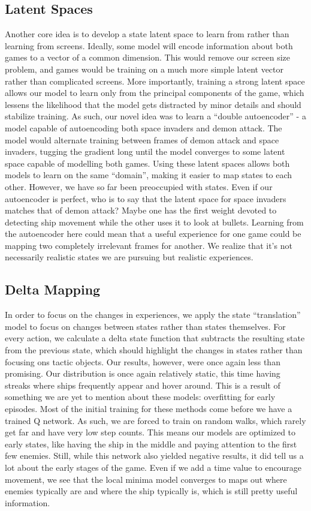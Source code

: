 \documentclass{article} %
\begin{document}
\subsection{Latent Spaces}
Another core idea is to develop a state latent space to learn from rather than learning from
screens. Ideally, some model will encode information about both games to a vector of a common
dimension. This would remove our screen size problem, and games would be training on a much more
simple latent vector rather than complicated screens. More importantly, training a strong latent
space allows our model to learn only from the principal components of the game, which lessens the
likelihood that the model gets distracted by minor details and should stabilize training. As such,
our novel idea was to learn a ``double autoencoder'' - a model capable of autoencoding both space
invaders and demon attack. The model would alternate training between frames of demon attack and
space invaders, tugging the gradient long until the model converges to some latent space capable of
modelling both games. Using these latent spaces allows both models to learn on the same “domain”,
making it easier to map states to each other. However, we have so far been preoccupied with states.
Even if our autoencoder is perfect, who is to say that the latent space for space invaders matches
that of demon attack? Maybe one has the first weight devoted to detecting ship movement while the
other uses it to look at bullets. Learning from the autoencoder here could mean that a useful
experience for one game could be mapping two completely irrelevant frames for another. We realize
that it's not necessarily realistic states we are pursuing but realistic experiences.

\subsection{Delta Mapping}
In order to focus on the changes in experiences, we apply the state ``translation'' model to focus on
changes between states rather than states themselves. For every action, we calculate a delta state
function that subtracts the resulting state from the previous state, which should highlight the
changes in states rather than focusing ons tactic objects. Our results, however, were once again
less than promising. Our distribution is once again relatively static, this time having streaks
where ships frequently appear and hover around. This is a result of something we are yet to mention
about these models: overfitting for early episodes. Most of the initial training for these methods
come before we have a trained Q network. As such, we are forced to train on random walks, which
rarely get far and have very low step counts. This means our models are optimized to early states,
like having the ship in the middle and paying attention to the first few enemies. Still, while this
network also yielded negative results, it did tell us a lot about the early stages of the game. Even
if we add a time value to encourage movement, we see that the local minima model converges to maps
out where enemies typically are and where the ship typically is, which is still pretty useful
information.
\end{document}
